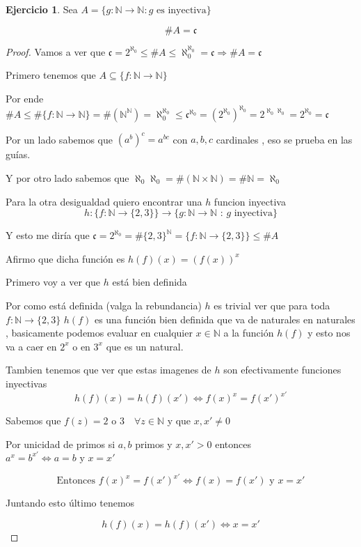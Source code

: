 \documentclass[12pt]{article}
\newcommand{\N}{\mathbb{N}}
\newcommand{\Ra}{\Rightarrow}
\newcommand{\ra}{\rightarrow}
\newcommand{\n}{\aleph_{0}}
\theoremstyle{definition}
\newtheorem{ej}{Ejercicio}
\begin{document}
\begin{ej}
  
  Sea $ A = \{g: \N \ra \N : g \text{ es inyectiva}\}$ 

  $$\# A  = \mathfrak{c}$$

  \begin{proof}
    Vamos a ver que $\mathfrak{c} = 2^{\n} \leq \# A \leq \n^{\n} = \mathfrak{c} \Ra \# A = \mathfrak{c}$


    Primero tenemos que $A \subseteq \{f:\N \ra \N\}$

    Por ende $\#A \leq \# \{f: \N \ra \N\} = \#(\N^{\N}) = \n^{\n} \leq \mathfrak{c}^{\n} = (2^{\n})^{\n} = 2^{\n \n} = 2^{\n} = \mathfrak{c} $

    Por un lado sabemos que $(a^b)^c = a^{bc}$ con $a,b,c$ cardinales , eso se prueba en las guías. 

    Y por otro lado sabemos que $\n \n  = \# (\N \times \N) = \# \N = \n$

    Para la otra desigualdad quiero encontrar una $h$ funcion inyectiva 
  $$h: \{f:\N \ra \{2,3\}\} \ra \{g: \N \ra \N \text{ : $g$ inyectiva}\}$$

    Y esto me diría que $\mathfrak{c} = 2^{\n} = \# \{2,3\}^{\N} = \{f: \N \ra \{2,3\}\} \leq \# A$

    Afirmo que dicha función es $h(f)(x) = (f(x))^{x}$

    Primero voy a ver que $h$ está bien definida 

    Por como está definida (valga la rebundancia) $h$ es trivial ver que para toda $f:\N \ra \{2,3\} $ $h(f)$ es una función bien definida que va de naturales en naturales , basicamente podemos evaluar en cualquier $x \in \N$ a la función $h(f)$ y esto nos va a caer en $2^x$ o en $3^x$ que es un natural.  

    Tambien tenemos que ver que estas imagenes de $h$ son efectivamente funciones inyectivas 
    $$h(f)(x) = h(f)(x') \iff f(x)^x = f(x')^{x'}$$ 

    Sabemos que $f(z) = 2 $ o $ 3 \quad \forall z \in \N$ y que $x,x' \neq 0$

    Por unicidad de primos si $a,b$ primos y $x,x' > 0$ entonces $a^x = b^{x'} \iff a = b \text{ y } x = x'$

    $$ \text{Entonces } f(x)^x = f(x')^{x'} \iff f(x) = f(x') \text{ y } x = x'$$

    Juntando esto último tenemos 

    $$ h(f)(x) = h(f)(x') \iff x = x'$$


\end{proof}
\end{ej}
\end{document}
